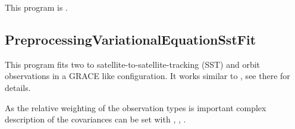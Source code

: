 This program is .
\clearpage
\subsection{PreprocessingVariationalEquationSstFit}\label{PreprocessingVariationalEquationSstFit}
This program fits two  to satellite-to-satellite-tracking (SST) and orbit
observations in a GRACE like configuration. It works similar to ,
see there for details.

As the relative weighting of the observation types is important complex description of the covariances can be set with
, , .


